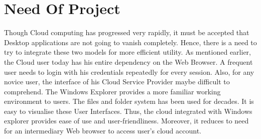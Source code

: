 \section{Need Of Project}
Though Cloud computing has progressed very rapidly, it must be accepted that Desktop applications are not going to vanish completely. Hence, there is a need to try to integrate these two models for more efficient utility.
As mentioned earlier, the Cloud user today has his entire dependency on the Web Browser. A frequent user needs to login with his credentials repeatedly for every session. Also, for any novice user, the interface of his Cloud Service Provider maybe difficult to comprehend. 
  The Windows Explorer provides a more familiar working environment to users. The files and folder system has been used for decades. It is easy to visualise these User Interfaces.  Thus, the cloud integrated with Windows explorer provides ease of use and user-friendliness. Moreover, it reduces to need for an intermediary Web browser to access user’s cloud account. 




